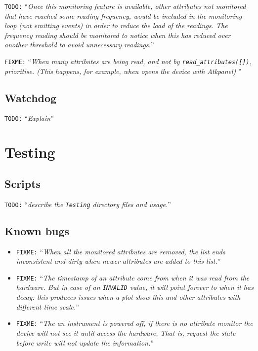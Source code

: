 \documentclass[a4paper,10pt]{article}
\newcommand{\todo}[1]{\texttt{\color{red}TODO:} ``\emph{#1}''}
\newcommand{\fixme}[1]{\texttt{\color{red}FIXME:} ``\emph{#1}''}
\begin{document}
\todo{Once this monitoring feature is available, other attributes not monitored that have reached some reading frequency, would be included in the monitoring loop (not emitting events) in order to reduce the load of the readings. The frequency reading should be monitored to notice when this has reduced over another threshold to avoid unnecessary readings.}

\fixme{When many attributes are being read, and not by {\tt read\_attributes([])}, prioritise. (This happens, for example, when opens the device with \emph{Atkpanel}) }

\subsection{Watchdog}\label{sec:watchdog}

\todo{Explain}

\section{Testing}\label{sec:testing}

\subsection{Scripts}

\todo{describe the \texttt{Testing} directory files and usage.}

\subsection{Known bugs}\label{sec:bugs}

\begin{itemize}
    \item \fixme{When all the monitored attributes are removed, the list ends inconsistent and dirty when newer attributes are added to this list.}
    \item \fixme{The timestamp of an attribute come from when it was read from the hardware. But in case of an \texttt{INVALID} value, it will point forever to when it has decay: this produces issues when a plot show this and other attributes with different time scale.}
    \item \fixme{The an instrument is powered off, if there is no attribute monitor the device will not see it until access the hardware. That is, request the \emph{state} before write will not update the information.}
\end{itemize}
\end{document}
